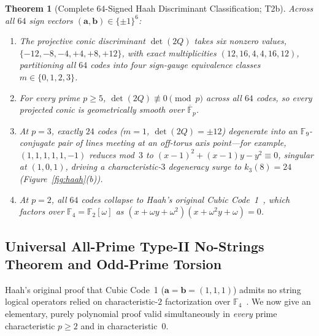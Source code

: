 \documentclass[11pt,reqno]{amsart}
\newtheorem{theorem}{Theorem}[section]
\theoremstyle{definition}
\newcommand{\F}{\mathbb{F}}
\begin{document}
\begin{theorem}[Complete $64$-Signed Haah Discriminant Classification; \textsf{T2b}]
\label{thm:t2b}
Across all $64$ sign vectors $(\mathbf{a}, \mathbf{b}) \in \{\pm 1\}^6$:
\begin{enumerate}[leftmargin=2em]
  \item The projective conic discriminant $\det(2Q)$ takes six nonzero values,
    $\{-12, -8, -4, +4, +8, +12\}$, with exact multiplicities $(12, 16, 4, 4, 16, 12)$,
    partitioning all $64$ codes into four sign-gauge equivalence classes $m \in \{0,1,2,3\}$.
  \item For \emph{every} prime $p \ge 5$, $\det(2Q) \not\equiv 0 \pmod{p}$ across all $64$ codes,
    so every projected conic is geometrically smooth over $\overline{\F}_p$.
  \item At $p = 3$, exactly $24$ codes ($m=1$, $\det(2Q) = \pm 12$) degenerate into an
    $\F_9$-conjugate pair of lines meeting at an off-torus axis point---for example,
    $(1,1,1,1,1,-1)$ reduces mod~$3$ to $(x-1)^2 + (x-1)y - y^2 \equiv 0$, singular at $(1,0,1)$,
    driving a characteristic-$3$ degeneracy surge to $k_3(8) = 24$ (Figure~\ref{fig:haah}(b)).
  \item At $p = 2$, all $64$ codes collapse to Haah's original Cubic Code~1~\cite{haah2011local},
    which factors over $\F_4 = \F_2[\omega]$ as $(x + \omega y + \omega^2)(x + \omega^2 y + \omega) = 0$.
\end{enumerate}
\end{theorem}

\subsection{Universal All-Prime Type-II No-Strings Theorem and Odd-Prime Torsion}

Haah's original proof that Cubic Code~1 ($\mathbf{a}=\mathbf{b}=(1,1,1)$) admits no string logical
operators relied on characteristic-$2$ factorization over $\F_4$~\cite{haah2011local,haah2013commuting}.
We now give an elementary, purely polynomial proof valid simultaneously in \emph{every} prime
characteristic $p \ge 2$ and in characteristic~$0$.
\end{document}
